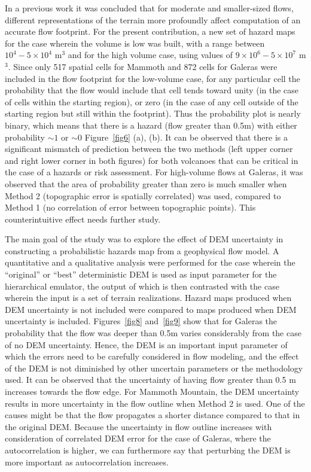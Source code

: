 \documentclass[12pt]{article}
\begin{document}
In a previous work \citep{stefanescu1} it was concluded that for moderate and
smaller-sized flows, different representations of the terrain more
profoundly affect computation of an accurate flow footprint.  For the
present contribution, a new set of hazard maps for the
case wherein the volume is low was built, with a range between $10^4 - 5\times
10^4$ m$^3$ and for the high volume case, using values of $9\times 10^6 - 5\times
10^7$ m$^3$.  Since only 517 spatial cells for Mammoth and 872 cells
for Galeras were included in the flow footprint for the low-volume
case, for any particular cell the probability that the flow would
include that cell tends toward unity (in the case of cells within the
starting region), or zero (in the case of any cell outside of the
starting region but still within the footprint).  Thus the probability
plot is nearly binary, which means that there is a hazard (flow
greater than 0.5m) with either probability $\sim1$ or $\sim0$
Figure~\ref{fig6} (a), (b). It can be observed that there is a significant
mismatch of prediction between the two methods (left upper corner and
right lower corner in both figures) for both volcanoes that can be
critical in the case of a hazards or risk assessment.  For high-volume
flows at Galeras, it was observed that the area of probability greater than
zero is much smaller when Method 2 (topographic error is spatially 
correlated) was used, compared to Method 1 (no correlation of error between
topographic points). This counterintuitive effect needs further study.

The main goal of the study was to explore the effect of DEM uncertainty in
constructing a probabilistic hazards map from a geophysical flow model.  A quantitative and a qualitative analysis
were performed for the case wherein the ``original'' or ``best''
deterministic DEM \citep{stefanescu2} is used as input parameter for the hierarchical
emulator, the output of which is then contrasted with the case wherein
the input is a set of terrain realizations.
Hazard maps produced when DEM uncertainty is not
included were compared to maps produced when DEM uncertainty is included.
Figures~\ref{fig8} and~\ref{fig9} show that for Galeras the
probability that the flow was deeper than 0.5m varies considerably
from the case of no DEM uncertainty. Hence, the DEM is an important
input parameter of which the errors need to be carefully considered in
flow modeling, and the effect of the DEM is not diminished by other
uncertain parameters or the methodology used.  It can be observed that the
uncertainty of having flow greater than 0.5 m increases towards the
flow edge. For Mammoth Mountain, the DEM uncertainty results in more
uncertainty in the flow outline when Method 2 is used. One of the
causes might be that the flow propagates a shorter distance compared
to that in the original DEM.
Because the uncertainty in flow outline increases with consideration of correlated DEM error for the case of
Galeras, where the autocorrelation is higher, we can furthermore say
that perturbing the DEM is more important as autocorrelation
increases.
\end{document}
